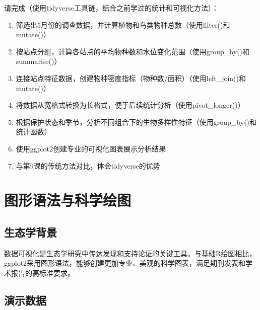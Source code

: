 \documentclass[
]{book}
\begin{document}
请完成（使用tidyverse工具链，结合之前学过的统计和可视化方法）：

\begin{enumerate}
\def\labelenumi{\arabic{enumi}.}
\item
  筛选出5月份的调查数据，并计算植物和鸟类物种总数（使用filter()和mutate()）
\item
  按站点分组，计算各站点的平均物种数和水位变化范围（使用group\_by()和summarise()）
\item
  连接站点特征数据，创建物种密度指标（物种数/面积）（使用left\_join()和mutate()）
\item
  将数据从宽格式转换为长格式，便于后续统计分析（使用pivot\_longer()）
\item
  根据保护状态和季节，分析不同组合下的生物多样性特征（使用group\_by()和统计函数）
\item
  使用ggplot2创建专业的可视化图表展示分析结果
\item
  与第9课的传统方法对比，体会tidyverse的优势
\end{enumerate}

\hypertarget{ux56feux5f62ux8bedux6cd5ux4e0eux79d1ux5b66ux7ed8ux56fe}{%
\section{图形语法与科学绘图}\label{ux56feux5f62ux8bedux6cd5ux4e0eux79d1ux5b66ux7ed8ux56fe}}

\hypertarget{ux751fux6001ux5b66ux80ccux666f-9}{%
\subsection{生态学背景}\label{ux751fux6001ux5b66ux80ccux666f-9}}

数据可视化是生态学研究中传达发现和支持论证的关键工具。与基础R绘图相比，ggplot2采用图形语法，能够创建更加专业、美观的科学图表，满足期刊发表和学术报告的高标准要求。

\hypertarget{ux6f14ux793aux6570ux636e-8}{%
\subsection{演示数据}\label{ux6f14ux793aux6570ux636e-8}}
\end{document}

